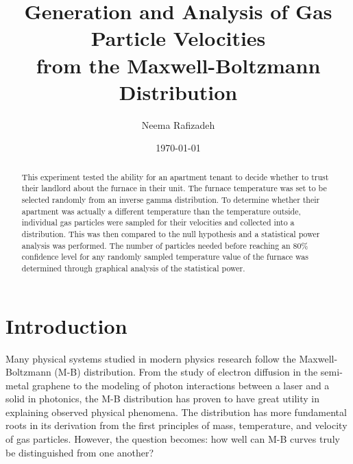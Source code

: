 \documentclass[%
 reprint,
 amsmath,amssymb,
 aps,
]{revtex4-2}
\begin{document}

\title{Generation and Analysis of Gas Particle Velocities \\from the Maxwell-Boltzmann Distribution}%

\author{Neema Rafizadeh}
%

\date{\today}

\begin{abstract}

This experiment tested the ability for an apartment tenant to decide whether to trust their landlord about the furnace in their unit. The furnace temperature was set to be selected randomly from an inverse gamma distribution. To determine whether their apartment was actually a different temperature than the temperature outside, individual gas particles were sampled for their velocities and collected into a distribution. This was then compared to the null hypothesis and a statistical power analysis was performed. The number of particles needed before reaching an 80\% confidence level for any randomly sampled temperature value of the furnace was determined through graphical analysis of the statistical power. 
\end{abstract}


\maketitle


\section{Introduction \protect\\ }

Many physical systems studied in modern physics research follow the Maxwell-Boltzmann (M-B) distribution. From the study of electron diffusion in the semi-metal graphene to the modeling of photon interactions between a laser and a solid in photonics, the M-B distribution has proven to have great utility in explaining observed physical phenomena. The distribution has more fundamental roots in its derivation from the first principles of mass, temperature, and velocity of gas particles. However, the question becomes: how well can M-B curves truly be distinguished from one another?  
\end{document}
